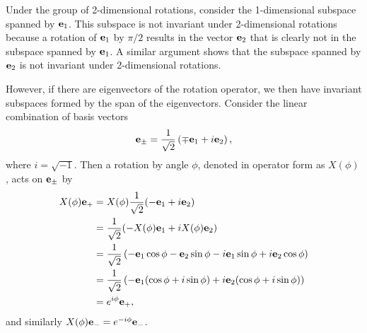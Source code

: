 \begin{example}
    Under the group of 2-dimensional rotations, consider the 1-dimensional subspace spanned by $\mathbf{e}_1$. This subspace is not invariant under 2-dimensional rotations because a rotation of $\mathbf{e}_1$ by $\pi/2$ results in the vector $\mathbf{e}_2$ that is clearly not in the subspace spanned by $\mathbf{e}_1$. A similar argument shows that the subspace spanned by $\mathbf{e}_2$ is not invariant under 2-dimensional rotations.

    However, if there are eigenvectors of the rotation operator, we then have invariant subspaces formed by the span of the eigenvectors.
    Consider the linear combination of basis vectors
    \begin{equation}
        \mathbf{e}_\pm = \frac{1}{\sqrt{2}}\left( \mp\mathbf{e}_1 + i\mathbf{e}_2 \right),
    \end{equation}
    where $i = \sqrt{-1}$. Then a rotation by angle $\phi$, denoted in operator form as $X(\phi)$, acts on $\mathbf{e}_\pm$ by
    \begin{align}
        \begin{split}            
        X(\phi)\mathbf{e}_+ &= X(\phi)\frac{1}{\sqrt{2}}(-\mathbf{e}_1 + i\mathbf{e}_2) \\
        &= \frac{1}{\sqrt{2}}(-X(\phi)\mathbf{e}_1 + iX(\phi)\mathbf{e}_2) \\
        &= \frac{1}{\sqrt{2}}\left( -\mathbf{e}_1\cos\phi - \mathbf{e}_2\sin\phi -i\mathbf{e}_1\sin\phi + i\mathbf{e}_2\cos\phi \right) \\
        &= \frac{1}{\sqrt{2}}\left( -\mathbf{e}_1(\cos\phi + i\sin\phi) + i\mathbf{e}_2(\cos\phi+i\sin\phi) \right) \\
        &= e^{i\phi}\mathbf{e}_+,
        \end{split}
    \end{align}
    and similarly $X(\phi)\mathbf{e}_- = e^{-i\phi}\mathbf{e}_-$.


\end{example}
